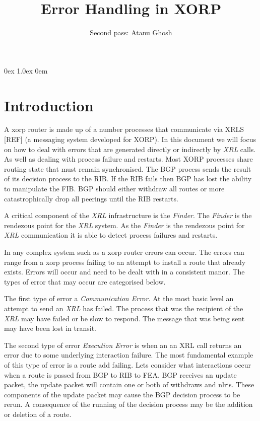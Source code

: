 \documentclass[11pt]{article}
\title{Error Handling in XORP}
\author{Second pass: Atanu Ghosh}
\makeatletter
\newcommand{\finder} {{\em Finder}\@\xspace}
\newcommand{\xrl} {{\em XRL}\@\xspace}
\makeatother
\begin{document}
\parsep 0ex
\parskip 1.0ex
\parindent 0em
\noindent
\maketitle                            
\section{Introduction}

A xorp router is made up of a number processes that communicate via
XRLS [REF] (a messaging system developed for XORP). In this document
we will focus on how to deal with errors that are generated directly
or indirectly by \xrl calls. As well as dealing with process failure
and restarts. Most XORP processes share routing state that must remain
synchronised. The BGP process sends the result of its decision process
to the RIB. If the RIB fails then BGP has lost the ability to
manipulate the FIB. BGP should either withdraw all routes or more
catastrophically drop all peerings until the RIB restarts.

A critical component of the \xrl infrastructure is the \finder. The
\finder is the rendezous point for the \xrl system.  As the \finder is
the rendezous point for \xrl communication it is able to detect
process failures and restarts.

In any complex system such as a xorp router errors can occur. The
errors can range from a xorp process failing to an attempt to install
a route that already exists. Errors will occur and need to be dealt
with in a consistent manor. The types of error that may occur are
categorised below.

The first type of error a {\em Communication Error}. At the most basic
level an attempt to send an \xrl has failed. The process that was the
recipient of the \xrl may have failed or be slow to respond. The
message that was being sent may have been lost in transit.

The second type of error {\em Execution Error} is when an an XRL call
returns an error due to some underlying interaction failure. The most
fundamental example of this type of error is a route add failing. Lets
consider what interactions occur when a route is passed from BGP to
RIB to FEA. BGP receives an update packet, the update packet will
contain one or both of withdraws and nlris. These components of the
update packet may cause the BGP decision process to be rerun. A
consequence of the running of the decision process may be the addition
or deletion of a route.
\end{document}
